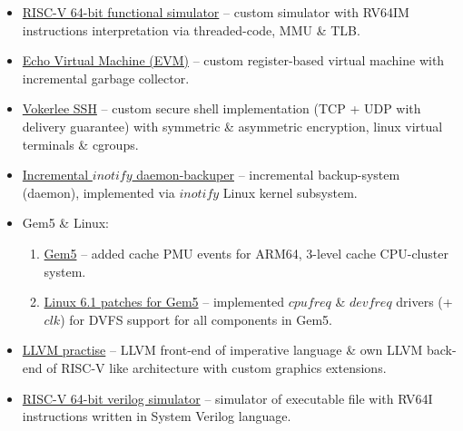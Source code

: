     \begin{itemize}
        \item \href{https://github.com/Vokerlee/riscv64-simulator}
                   {RISC-V 64-bit functional simulator} -- custom simulator with RV64IM instructions
            interpretation via threaded-code, MMU \& TLB.
        \item \href{https://github.com/Vokerlee/EVM}
                   {Echo Virtual Machine (EVM)} -- custom register-based virtual machine
            with incremental garbage collector.
        \item \href{https://github.com/Vokerlee/VSSH}
                   {Vokerlee SSH} -- custom secure shell implementation (TCP + UDP with delivery guarantee)
            with symmetric \& asymmetric encryption, linux virtual terminals \& cgroups.
        \item \href{https://github.com/Vokerlee/linux-api-course/tree/master/5.%20Daemon-backuper}
                   {Incremental $inotify$ daemon-backuper} -- incremental backup-system (daemon), implemented via $inotify$
            Linux kernel subsystem.
        \item Gem5 \& Linux:
        \begin{enumerate}
            \item \href{https://github.com/Vokerlee/gem5-arm-dev}
                       {Gem5} -- added cache PMU events for ARM64, 3-level cache CPU-cluster system.
            \item \href{https://github.com/Vokerlee/linux-6.1-arm-gem5}
                       {Linux 6.1 patches for Gem5} -- implemented $cpufreq$ \& $devfreq$ drivers (+ $clk$)
                for DVFS support for all components in Gem5.
        \end{enumerate}
        \item \href{https://github.com/Vokerlee/llvm-practice}
                   {LLVM practise} -- LLVM front-end of imperative language \& own LLVM back-end of RISC-V like
            architecture with custom graphics extensions.
        \item \href{https://github.com/Vokerlee/cpu-riscv64-pipeline}
                   {RISC-V 64-bit verilog simulator} -- simulator of executable file with RV64I instructions written in
            System Verilog language.

    \end{itemize}

\clearpage


\nocite{*}


